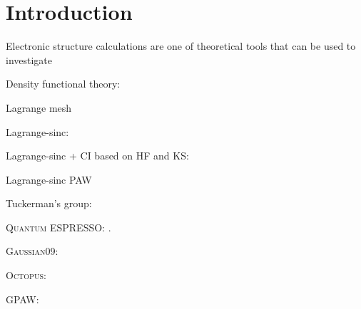 \section{Introduction}

Electronic structure calculations are one of theoretical tools that can be used to
investigate

Density functional theory: \cite{Hohenberg1964,Kohn1965}

Lagrange mesh \cite{Baye2015}

Lagrange-sinc: \cite{Choi2015,Choi2016}

Lagrange-sinc + CI based on HF and KS: \cite{Kim2015}

Lagrange-sinc PAW \cite{Kang2016}

Tuckerman's group: \cite{HeeSeungLee2005,HeeSeungLee2006,HeeSeungLee2008}

\textsc{Quantum ESPRESSO}: \cite{Giannozzi2009,Giannozzi2017}.

\textsc{Gaussian09}: \cite{Gaussian2009}

\textsc{Octopus}: \cite{Marques2003,Castro2006,Xavier2015}

GPAW: \cite{Enkovaara2010}